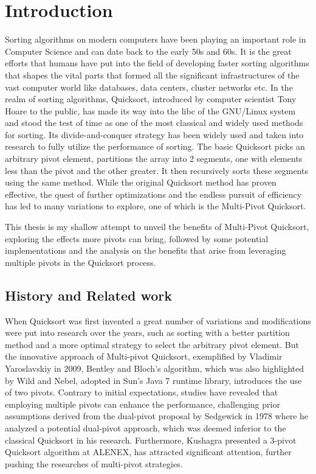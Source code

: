 \documentclass{article}
\begin{document}
\section{Introduction}
Sorting algorithms on modern computers have been playing an important role in Computer Science and can date back to the early 50s and 60s. 
It is the great efforts that humans have put into the field of developing faster sorting algorithms that shapes the vital parts that formed
all the significant infrastructures of the vast computer world like databases, data centers, cluster networks etc.
In the realm of sorting algorithms, Quicksort, introduced by computer scientist Tony Hoare \cite{HoareQuickSort} to the public,
has made its way into the libc of the GNU/Linux system and stood the test of time as one of the most classical and widely used methods for sorting. 
Its divide-and-conquer strategy has been widely used and taken into research to fully utilize the performance of sorting.
The basic Quicksort picks an arbitrary pivot element,
partitions the array into 2 segments, one with elements less than the pivot and the other greater. 
It then recursively sorts these segments using the same method. While the original Quicksort method has proven effective,
the quest of further optimizations and the endless pursuit of efficiency has led to many variations to explore, one of which is the Multi-Pivot Quicksort. 

This thesis is my shallow attempt to unveil the benefits of Multi-Pivot Quicksort, exploring the effects more pivots can bring,
followed by some potential implementations and the analysis on the benefits that arise from leveraging multiple pivots in the Quicksort process.

\subsection{History and Related work} 

When Quicksort was first invented a great number of variations and modifications were put into research over the years, 
such as sorting with a better partition method and a more optimal strategy to select the arbitrary pivot element.
But the innovative approach of Multi-pivot Quicksort, exemplified by Vladimir Yaroslavskiy \cite{Yaroslavskiy} in 2009,
Bentley and Bloch's algorithm, which was also highlighted by Wild and Nebel, adopted in Sun's Java 7 runtime library, 
introduces the use of two pivots. Contrary to initial expectations, studies have revealed that employing multiple pivots can enhance the performance,
challenging prior assumptions derived from the dual-pivot proposal by Sedgewick \cite{Sedgewick} in 1978 where he analyzed a potential dual-pivot approach, 
which was deemed inferior to the classical Quicksort in his research. Furthermore, Kushagra presented a 3-pivot Quicksort \cite{Kushagra} algorithm at ALENEX,
has attracted significant attention, further pushing the researches of multi-pivot strategies. 
\end{document}
